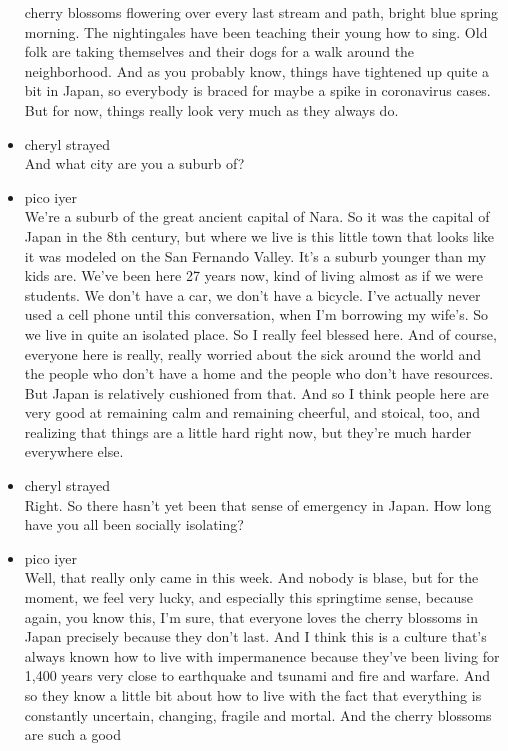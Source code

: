 \begin{itemize}
  cherry blossoms flowering over every last stream and path, bright blue
  spring morning. The nightingales have been teaching their young how to
  sing. Old folk are taking themselves and their dogs for a walk around
  the neighborhood. And as you probably know, things have tightened up
  quite a bit in Japan, so everybody is braced for maybe a spike in
  coronavirus cases. But for now, things really look very much as they
  always do.
\item
  cheryl strayed\\
  And what city are you a suburb of?
\item
  pico iyer\\
  We're a suburb of the great ancient capital of Nara. So it was the
  capital of Japan in the 8th century, but where we live is this little
  town that looks like it was modeled on the San Fernando Valley. It's a
  suburb younger than my kids are. We've been here 27 years now, kind of
  living almost as if we were students. We don't have a car, we don't
  have a bicycle. I've actually never used a cell phone until this
  conversation, when I'm borrowing my wife's. So we live in quite an
  isolated place. So I really feel blessed here. And of course, everyone
  here is really, really worried about the sick around the world and the
  people who don't have a home and the people who don't have resources.
  But Japan is relatively cushioned from that. And so I think people
  here are very good at remaining calm and remaining cheerful, and
  stoical, too, and realizing that things are a little hard right now,
  but they're much harder everywhere else.
\item
  cheryl strayed\\
  Right. So there hasn't yet been that sense of emergency in Japan. How
  long have you all been socially isolating?
\item
  pico iyer\\
  Well, that really only came in this week. And nobody is blase, but for
  the moment, we feel very lucky, and especially this springtime sense,
  because again, you know this, I'm sure, that everyone loves the cherry
  blossoms in Japan precisely because they don't last. And I think this
  is a culture that's always known how to live with impermanence because
  they've been living for 1,400 years very close to earthquake and
  tsunami and fire and warfare. And so they know a little bit about how
  to live with the fact that everything is constantly uncertain,
  changing, fragile and mortal. And the cherry blossoms are such a good

\end{itemize}
